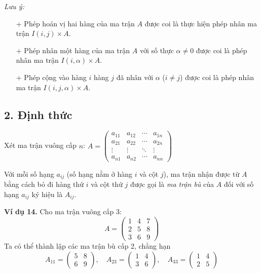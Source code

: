\textit{Lưu ý:}
\begin{itemize}
    \item [+] Phép hoán vị hai hàng của ma trận \( A \) được coi là thực hiện phép nhân ma trận \( I(i, j) \times A \).
    \item [+] Phép nhân một hàng của ma trận \( A \) với số thực \( \alpha \neq 0 \) được coi là phép nhân ma trận \( I(i, \alpha) \times A \).
    \item [+] Phép cộng vào hàng \( i \) hàng \( j \) đã nhân với \( \alpha \) (\( i \neq j \)) được coi là phép nhân ma trận \( I(i, j, \alpha) \times A \).
\end{itemize}
\subsection*{2. Định thức}
Xét ma trận vuông cấp \( n \): \( A = \begin{pmatrix}
a_{11} & a_{12} & \cdots & a_{1n} \\
a_{21} & a_{22} & \cdots & a_{2n} \\
\vdots & \vdots & \ddots & \vdots \\
a_{n1} & a_{n2} & \cdots & a_{nn}
\end{pmatrix} \)

Với mỗi số hạng \( a_{ij} \) (số hạng nằm ở hàng \( i \) và cột \( j \)), ma trận nhận được từ \( A \) bằng cách bỏ đi hàng thứ \( i \) và cột thứ \( j \) được gọi là \textit{ma trận bù} của \( A \) đối với số hạng \( a_{ij} \) ký hiệu là \( A_{ij} \).

\textbf{Ví dụ 14.} Cho ma trận vuông cấp 3:
\[
A = \begin{pmatrix}
1 & 4 & 7 \\
2 & 5 & 8 \\
3 & 6 & 9
\end{pmatrix}
\]
Ta có thể thành lập các ma trận bù cấp 2, chẳng hạn
\[
A_{11} = \begin{pmatrix}
5 & 8 \\
6 & 9
\end{pmatrix}
, \quad
A_{23} = \begin{pmatrix}
1 & 4 \\
3 & 6
\end{pmatrix}
, \quad
A_{33} = \begin{pmatrix}
1 & 4 \\
2 & 5
\end{pmatrix}
\]

